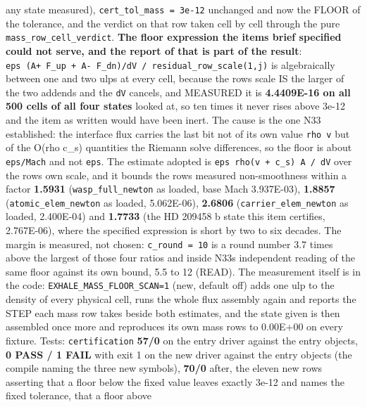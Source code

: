 \documentclass[english,a4paper]{my_memo}
\begin{document}
\begin{itemize}
  any state measured), \texttt{cert\_tol\_mass\ =\ 3e-12} unchanged and now the FLOOR of
  the tolerance, and the verdict on that row taken cell by cell through the
  pure \texttt{mass\_row\_cell\_verdict}. \textbf{The floor expression the item\textquotesingle s brief
  specified could not serve, and the report of that is part of the result}:
  \texttt{eps\ (\textbar{}A+\ F\_up\textbar{}\ +\ \textbar{}A-\ F\_dn\textbar{})/dV\ /\ residual\_row\_scale(1,j)} is algebraically
  between one and two ulps at every cell, because the row\textquotesingle s scale IS the larger
  of the two addends and the \texttt{dV} cancels, and MEASURED it is \textbf{4.4409E-16 on
  all 500 cells of all four states} looked at, so ten times it never rises
  above 3e-12 and the item as written would have been inert. The cause is the
  one N33 established: the interface flux carries the last bit not of its own
  value \texttt{rho\ v} but of the O(rho c\_s) quantities the Riemann solve differences,
  so the floor is about \texttt{eps/Mach} and not \texttt{eps}. The estimate adopted is
  \texttt{eps\ rho(\textbar{}v\textbar{}\ +\ c\_s)\ A\ /\ dV} over the row\textquotesingle s own scale, and it bounds the row\textquotesingle s
  measured non-smoothness within a factor \textbf{1.5931} (\texttt{wasp\_full\_newton} as
  loaded, base Mach 3.937E-03), \textbf{1.8857} (\texttt{atomic\_elem\_newton} as loaded,
  5.062E-06), \textbf{2.6806} (\texttt{carrier\_elem\_newton} as loaded, 2.400E-04) and
  \textbf{1.7733} (the HD 209458 b state this item certifies, 2.767E-06), where the
  specified expression is short by two to six decades. The margin is measured,
  not chosen: \texttt{c\_round\ =\ 10} is a round number 3.7 times above the largest of
  those four ratios and inside N33\textquotesingle s independent reading of the same floor
  against its own bound, 5.5 to 12 (READ). The measurement itself is in the
  code: \texttt{EXHALE\_MASS\_FLOOR\_SCAN=1} (new, default off) adds one ulp to the
  density of every physical cell, runs the whole flux assembly again and
  reports the STEP each mass row takes beside both estimates, and the state
  given is then assembled once more and reproduces its own mass rows to
  0.00E+00 on every fixture. Tests: \texttt{certification} \textbf{57/0} on the entry
  driver against the entry objects, \textbf{0 PASS / 1 FAIL} with exit 1 on the new
  driver against the entry objects (the compile naming the three new symbols),
  \textbf{70/0} after, the eleven new rows asserting that a floor below the fixed
  value leaves exactly 3e-12 and names the fixed tolerance, that a floor above

\end{itemize}
\end{document}
